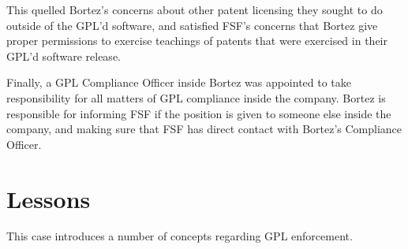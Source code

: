 This quelled Bortez's concerns about other patent licensing they sought to
do outside of the GPL'd software, and satisfied FSF's concerns that Bortez
give proper permissions to exercise teachings of patents that were
exercised in their GPL'd software release.

Finally, a GPL Compliance Officer inside Bortez was appointed to take
responsibility for all matters of GPL compliance inside the company.
Bortez is responsible for informing FSF if the position is given to
someone else inside the company, and making sure that FSF has direct
contact with Bortez's Compliance Officer.

\section{Lessons}

This case introduces a number of concepts regarding GPL enforcement.

